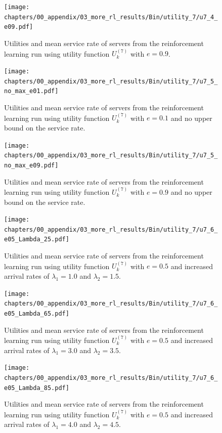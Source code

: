 \begin{figure}[H]
    \texttt{[image: chapters/00\_appendix/03\_more\_rl\_results/Bin/utility\_7/u7\_4\_e09.pdf]}
    \caption{Utilities and mean service rate of servers from the reinforcement
    learning run using utility function \(U_k^{(7)}\) with \(e = 0.9\).}
    \label{fig:RL_utility7_4_e09}
\end{figure}


\begin{figure}[H]
    \texttt{[image: chapters/00\_appendix/03\_more\_rl\_results/Bin/utility\_7/u7\_5\_no\_max\_e01.pdf]}
    \caption{Utilities and mean service rate of servers from the reinforcement
    learning run using utility function \(U_k^{(7)}\) with \(e = 0.1\) and no
    upper bound on the service rate.}
    \label{fig:RL_utility7_5_no_max_e01}
\end{figure}

\begin{figure}[H]
    \texttt{[image: chapters/00\_appendix/03\_more\_rl\_results/Bin/utility\_7/u7\_5\_no\_max\_e09.pdf]}
    \caption{Utilities and mean service rate of servers from the reinforcement
    learning run using utility function \(U_k^{(7)}\) with \(e = 0.9\) and no
    upper bound on the service rate.}
    \label{fig:RL_utility7_5_no_max_e09}
\end{figure}


\begin{figure}[H]
    \texttt{[image: chapters/00\_appendix/03\_more\_rl\_results/Bin/utility\_7/u7\_6\_e05\_Lambda\_25.pdf]}
    \caption{Utilities and mean service rate of servers from the reinforcement
    learning run using utility function \(U_k^{(7)}\) with \(e = 0.5\) and
    increased arrival rates of \(\lambda_1 = 1.0\) and \(\lambda_2 = 1.5\).}
    \label{fig:RL_utility7_6_e05_Lambda_25}
\end{figure}

\begin{figure}[H]
    \texttt{[image: chapters/00\_appendix/03\_more\_rl\_results/Bin/utility\_7/u7\_6\_e05\_Lambda\_65.pdf]}
    \caption{Utilities and mean service rate of servers from the reinforcement
    learning run using utility function \(U_k^{(7)}\) with \(e = 0.5\) and
    increased arrival rates of \(\lambda_1 = 3.0\) and \(\lambda_2 = 3.5\).}
    \label{fig:RL_utility7_6_e05_Lambda_65}
\end{figure}

\begin{figure}[H]
    \texttt{[image: chapters/00\_appendix/03\_more\_rl\_results/Bin/utility\_7/u7\_6\_e05\_Lambda\_85.pdf]}
    \caption{Utilities and mean service rate of servers from the reinforcement
    learning run using utility function \(U_k^{(7)}\) with \(e = 0.5\) and
    increased arrival rates of \(\lambda_1 = 4.0\) and \(\lambda_2 = 4.5\).}
    \label{fig:RL_utility7_6_e05_Lambda_85}
\end{figure}